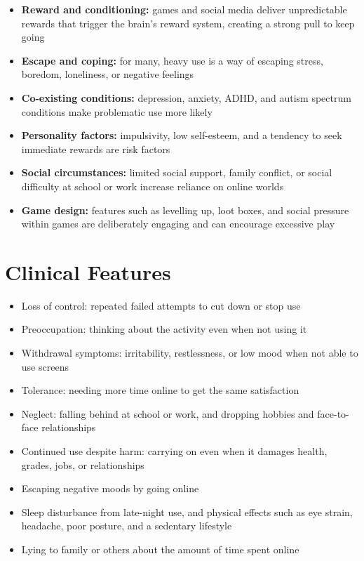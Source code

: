 \begin{itemize}
    \item \textbf{Reward and conditioning:} games and social media deliver unpredictable rewards that trigger the brain's reward system, creating a strong pull to keep going
    \item \textbf{Escape and coping:} for many, heavy use is a way of escaping stress, boredom, loneliness, or negative feelings
    \item \textbf{Co-existing conditions:} depression, anxiety, ADHD, and autism spectrum conditions make problematic use more likely
    \item \textbf{Personality factors:} impulsivity, low self-esteem, and a tendency to seek immediate rewards are risk factors
    \item \textbf{Social circumstances:} limited social support, family conflict, or social difficulty at school or work increase reliance on online worlds
    \item \textbf{Game design:} features such as levelling up, loot boxes, and social pressure within games are deliberately engaging and can encourage excessive play
\end{itemize}

\section*{Clinical Features}
\begin{itemize}
    \item Loss of control: repeated failed attempts to cut down or stop use
    \item Preoccupation: thinking about the activity even when not using it
    \item Withdrawal symptoms: irritability, restlessness, or low mood when not able to use screens
    \item Tolerance: needing more time online to get the same satisfaction
    \item Neglect: falling behind at school or work, and dropping hobbies and face-to-face relationships
    \item Continued use despite harm: carrying on even when it damages health, grades, jobs, or relationships
    \item Escaping negative moods by going online
    \item Sleep disturbance from late-night use, and physical effects such as eye strain, headache, poor posture, and a sedentary lifestyle
    \item Lying to family or others about the amount of time spent online
\end{itemize}

